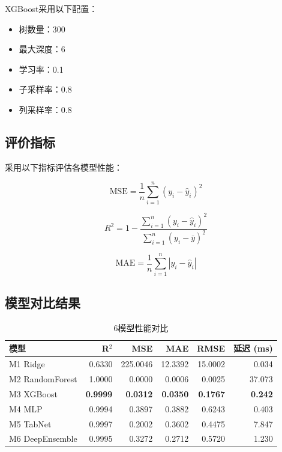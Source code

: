 XGBoost采用以下配置：
\begin{itemize}
    \item 树数量：300
    \item 最大深度：6
    \item 学习率：0.1
    \item 子采样率：0.8
    \item 列采样率：0.8
\end{itemize}

\subsection{评价指标}

采用以下指标评估各模型性能：

\begin{equation}
    \text{MSE} = \frac{1}{n}\sum_{i=1}^{n}(y_i - \hat{y}_i)^2
    \label{eq:mse}
\end{equation}

\begin{equation}
    R^2 = 1 - \frac{\sum_{i=1}^{n}(y_i - \hat{y}_i)^2}
                    {\sum_{i=1}^{n}(y_i - \bar{y})^2}
    \label{eq:r2}
\end{equation}

\begin{equation}
    \text{MAE} = \frac{1}{n}\sum_{i=1}^{n}|y_i - \hat{y}_i|
    \label{eq:mae}
\end{equation}

\subsection{模型对比结果}

\begin{table}[H]
\centering
\caption{6模型性能对比}
\begin{tabular}{lrrrrr}
\toprule
模型 & R$^2$ & MSE & MAE & RMSE & 延迟 (ms) \\
\midrule
M1 Ridge & 0.6330 & 225.0046 & 12.3392 & 15.0002 & 0.034 \\
M2 RandomForest & 1.0000 & 0.0000 & 0.0006 & 0.0025 & 37.073 \\
M3 XGBoost & \textbf{0.9999} & \textbf{0.0312} & \textbf{0.0350} & \textbf{0.1767} & \textbf{0.242} \\
M4 MLP & 0.9994 & 0.3897 & 0.3882 & 0.6243 & 0.403 \\
M5 TabNet & 0.9997 & 0.2002 & 0.3602 & 0.4475 & 7.847 \\
M6 DeepEnsemble & 0.9995 & 0.3272 & 0.2712 & 0.5720 & 1.230 \\
\bottomrule
\end{tabular}
\end{table}

